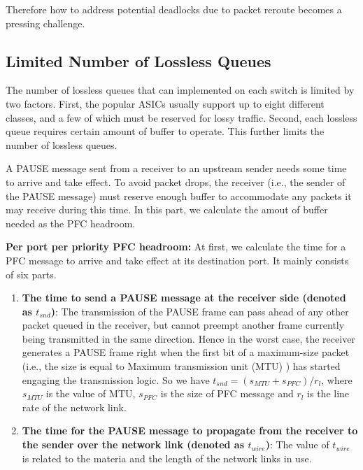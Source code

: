 {Therefore how to address potential deadlocks due to packet reroute becomes a pressing challenge.


\subsection{Limited Number of Lossless Queues}\label{subsec:pfcheadroom}

The number of lossless queues that can implemented on each switch is limited by two factors. First, the popular ASICs usually support up to eight different classes,
and a few of which must be reserved for lossy traffic. Second, each lossless queue requires certain amount of buffer to operate. This further limits the number of
lossless queues.


A PAUSE message sent from a receiver to an upstream sender needs some time to arrive and take effect. To avoid packet drops, the receiver (i.e., the sender of the PAUSE message) must reserve enough buffer to accommodate any packets it may receive during this time. In this part, we calculate the amout of buffer needed as the PFC headroom.

\textbf{Per port per priority PFC headroom:} At first, we calculate the time for a PFC message to arrive and take effect at its destination port. It mainly consists of six parts.

\begin{enumerate}
	
\item\textbf{The time to send a PAUSE message at the receiver side (denoted as $t_{snd}$)}: The transmission of the PAUSE frame  can pass ahead of any other packet queued in the receiver, but cannot preempt another frame currently being transmitted in the same direction. Hence in the worst case, the receiver generates a PAUSE frame right when the first bit of a maximum-size packet (i.e., the size is equal to Maximum transmission unit (MTU) ) has started engaging the transmission logic. So we have  $t_{snd}=(s_{MTU}+s_{PFC})/r_{l}$, where $s_{MTU}$ is the value of MTU, $s_{PFC}$ is the size of PFC message and $r_{l}$ is the line rate of the network link.

\item\textbf{The time for the PAUSE message to propagate from the receiver to the sender over the network link (denoted as $t_{wire}$)}: The value of  $t_{wire}$ is related to the materia and the length of the network links in use.


\end{enumerate}}
